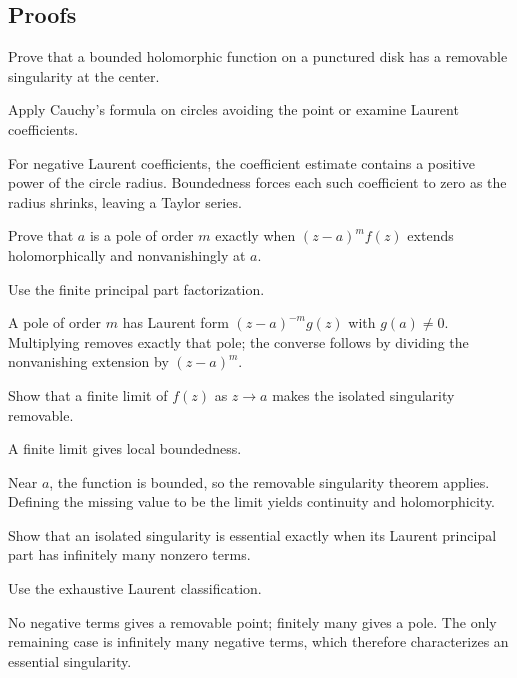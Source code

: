 \subsection*{Proofs}

\begin{exercise}\label{exr:iv09-expand-06}
Prove that a bounded holomorphic function on a punctured disk has a removable singularity at the center.
\end{exercise}
\begin{hint}
Apply Cauchy's formula on circles avoiding the point or examine Laurent coefficients.
\end{hint}
\begin{solution}
For negative Laurent coefficients, the coefficient estimate contains a positive power of the circle radius. Boundedness forces each such coefficient to zero as the radius shrinks, leaving a Taylor series.
\end{solution}

\begin{exercise}\label{exr:iv09-expand-07}
Prove that \(a\) is a pole of order \(m\) exactly when \((z-a)^m f(z)\) extends holomorphically and nonvanishingly at \(a\).
\end{exercise}
\begin{hint}
Use the finite principal part factorization.
\end{hint}
\begin{solution}
A pole of order \(m\) has Laurent form \((z-a)^{-m}g(z)\) with \(g(a)\ne0\). Multiplying removes exactly that pole; the converse follows by dividing the nonvanishing extension by \((z-a)^m\).
\end{solution}

\begin{exercise}\label{exr:iv09-expand-08}
Show that a finite limit of \(f(z)\) as \(z\to a\) makes the isolated singularity removable.
\end{exercise}
\begin{hint}
A finite limit gives local boundedness.
\end{hint}
\begin{solution}
Near \(a\), the function is bounded, so the removable singularity theorem applies. Defining the missing value to be the limit yields continuity and holomorphicity.
\end{solution}

\begin{exercise}\label{exr:iv09-expand-09}
Show that an isolated singularity is essential exactly when its Laurent principal part has infinitely many nonzero terms.
\end{exercise}
\begin{hint}
Use the exhaustive Laurent classification.
\end{hint}
\begin{solution}
No negative terms gives a removable point; finitely many gives a pole. The only remaining case is infinitely many negative terms, which therefore characterizes an essential singularity.
\end{solution}

